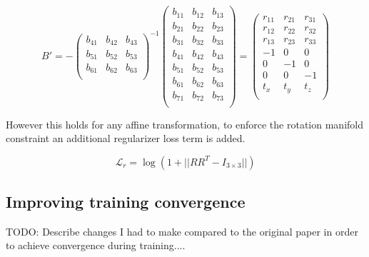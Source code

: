 \[
B'=
-
\begin{pmatrix}
b_{41} & b_{42} & b_{43} \\
b_{51} & b_{52} & b_{53} \\
b_{61} & b_{62} & b_{63} \\
\end{pmatrix}^{-1}
\begin{pmatrix}
b_{11} & b_{12} & b_{13} \\
b_{21} & b_{22} & b_{23} \\
b_{31} & b_{32} & b_{33} \\
b_{41} & b_{42} & b_{43} \\
b_{51} & b_{52} & b_{53} \\
b_{61} & b_{62} & b_{63} \\
b_{71} & b_{72} & b_{73} \\
\end{pmatrix}
=
\begin{pmatrix}
r_{11} & r_{21} & r_{31} \\
r_{12} & r_{22} & r_{32} \\
r_{13} & r_{23} & r_{33} \\
-1 & 0 & 0 \\
0 & -1 & 0 \\
0 & 0 & -1 \\
t_x & t_y & t_z \\
\end{pmatrix}
\]

However this holds for any affine transformation, to enforce the rotation manifold constraint an additional regularizer loss term is added.

\[
\mathcal{L}_r=\log(1 + || RR^T - I_{3\times3} ||)
\]

\subsection{Improving training convergence}

TODO: Describe changes I had to make compared to the original paper in order to achieve convergence during training....



